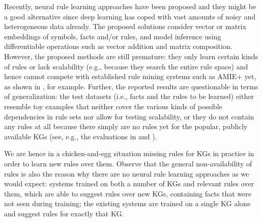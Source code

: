 Recently, {neural rule learning} approaches have been proposed  \cite{YaYaCo-NIPS17:neurallp,RoR-NIPS17,EGre-jair18:learning-explanatory-rules,Minervini+-NAMPI18:ntp-at-scale,OWaWa-IJCAI18:scalable-rule-learning,Campero+-corr18,Dong+-ICLR19:nlms} and they might be a good alternative %
since deep learning has coped with vast amounts of noisy and heterogeneous data already.
The proposed solutions consider vector or matrix embeddings of symbols, facts and/or rules, and model inference using differentiable operations such as vector addition and matrix composition. However, the proposed methods are still premature: they only learn certain kinds of rules or lack scalability (e.g., because they search the entire rule space) and hence cannot compete with established rule mining systems such as AMIE+ yet, as shown in \cite{OWaWa-IJCAI18:scalable-rule-learning}, for example. 
Further, the reported results are questionable in terms of generalization:
the test datasets (i.e., facts and the rules to be learned) either resemble toy examples that neither cover the various kinds of possible dependencies in rule sets nor allow for testing scalability, or they do not contain any rules at all because there simply are no rules yet for the popular, publicly available KGs (see, e.g., the evaluations in \cite{EGre-jair18:learning-explanatory-rules} and \cite{OWaWa-IJCAI18:scalable-rule-learning}).

We are hence in a chicken-and-egg situation missing rules for %
KGs in practice in order to learn new rules over them. Observe that the general non-availability of rules is also the reason why there are no neural rule learning approaches as we would expect: systems trained on both a number of KGs and relevant rules over them, which are able to suggest rules over new KGs, containing facts that were not seen during training; %
the existing systems are trained on a single KG alone and suggest rules for exactly that KG.

